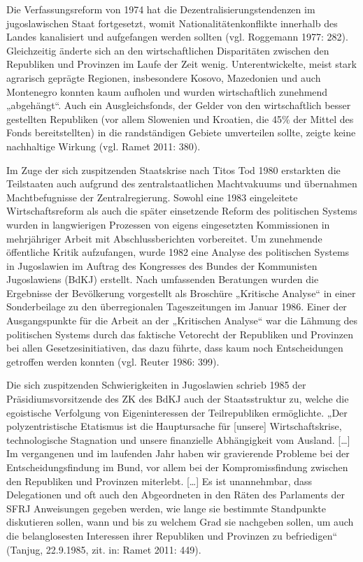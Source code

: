 Die Verfassungsreform von 1974 hat die Dezentralisierungstendenzen im jugoslawischen Staat fortgesetzt, womit Nationalitätenkonflikte innerhalb des Landes kanalisiert und aufgefangen werden sollten (vgl. Roggemann 1977: 282). Gleichzeitig änderte sich an den wirtschaftlichen Disparitäten zwischen den Republiken und Provinzen im Laufe der Zeit wenig. Unterentwickelte, meist stark agrarisch geprägte Regionen, insbesondere Kosovo, Mazedonien und auch Montenegro konnten kaum aufholen und wurden wirtschaftlich zunehmend „abgehängt“. Auch ein Ausgleichsfonds, der Gelder von den wirtschaftlich besser gestellten Republiken (vor allem Slowenien und Kroatien, die 45\% der Mittel des Fonds bereitstellten) in die randständigen Gebiete umverteilen sollte, zeigte keine nachhaltige Wirkung (vgl. Ramet 2011: 380).\par
Im Zuge der sich zuspitzenden Staatskrise nach Titos Tod 1980 erstarkten die Teilstaaten auch aufgrund des zentralstaatlichen Machtvakuums und übernahmen Machtbefugnisse der Zentralregierung. Sowohl eine 1983 eingeleitete Wirtschaftsreform als auch die später einsetzende Reform des politischen Systems wurden in langwierigen Prozessen von eigens eingesetzten Kommissionen in mehrjähriger Arbeit mit Abschlussberichten vorbereitet. Um zunehmende öffentliche Kritik aufzufangen, wurde 1982 eine Analyse des politischen Systems in Jugoslawien im Auftrag des Kongresses des Bundes der Kommunisten Jugoslawiens (BdKJ) erstellt. Nach umfassenden Beratungen wurden die Ergebnisse der Bevölkerung vorgestellt als Broschüre „Kritische Analyse“ in einer Sonderbeilage zu den überregionalen Tageszeitungen im Januar 1986. Einer der Ausgangspunkte für die Arbeit an der „Kritischen Analyse“ war die Lähmung des politischen Systems durch das faktische Vetorecht der Republiken und Provinzen bei allen Gesetzesinitiativen, das dazu führte, dass kaum noch Entscheidungen getroffen werden konnten (vgl. Reuter 1986: 399).\par
Die sich zuspitzenden Schwierigkeiten in Jugoslawien schrieb 1985 der Präsidiumsvorsitzende des ZK des BdKJ auch der Staatsstruktur zu, welche die egoistische Verfolgung von Eigeninteressen der Teilrepubliken ermöglichte. „Der polyzentristische Etatismus ist die Hauptursache für [unsere] Wirtschaftskrise, technologische Stagnation und unsere finanzielle Abhängigkeit vom Ausland. […] Im vergangenen und im laufenden Jahr haben wir gravierende Probleme bei der Entscheidungsfindung im Bund, vor allem bei der Kompromissfindung zwischen den Republiken und Provinzen miterlebt. […] Es ist unannehmbar, dass Delegationen und oft auch den Abgeordneten in den Räten des Parlaments der SFRJ Anweisungen gegeben werden, wie lange sie bestimmte Standpunkte diskutieren sollen, wann und bis zu welchem Grad sie nachgeben sollen, um auch die belanglosesten Interessen ihrer Republiken und Provinzen zu befriedigen“ (Tanjug, 22.9.1985, zit. in: Ramet 2011: 449).\par
